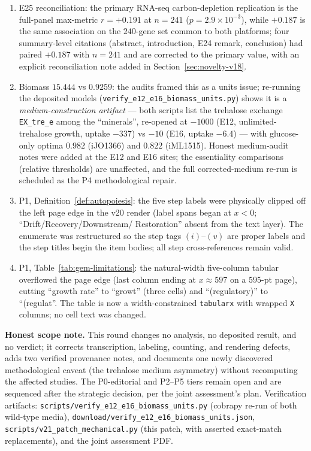 \documentclass[11pt,a4paper]{article}
\theoremstyle{plain}
\theoremstyle{definition}
\theoremstyle{remark}
\begin{document}
\begin{enumerate}
\texttt{autopoiesis\_ijO1366.csv} contains $11$ metabolites with
five or more producing reactions, of which $10$ are causally internal
(the single failure, ribose-D, has $n_{\mathrm{prod}} = 7$); the
totals $28/50$ and $18/39$ are unaffected.
\item E25 reconciliation: the primary RNA-seq carbon-depletion
replication is the full-panel max-metric $r = +0.191$ at $n = 241$
($p = 2.9 \times 10^{-3}$), while $+0.187$ is the same association
on the $240$-gene set common to both platforms; four summary-level
citations (abstract, introduction, E24 remark, conclusion) had paired
$+0.187$ with $n = 241$ and are corrected to the primary value, with
an explicit reconciliation note added in
Section~\ref{sec:novelty-v18}.
\item Biomass $15.444$ vs $0.9259$: the audits framed this as a
units issue; re-running the deposited models
(\texttt{verify\_e12\_e16\_biomass\_units.py}) shows it is a
\emph{medium-construction artifact} --- both scripts list the
trehalose exchange \texttt{EX\_tre\_e} among the ``minerals'',
re-opened at $-1000$ (E12, unlimited-trehalose growth, uptake
$-337$) vs $-10$ (E16, uptake $-6.4$) --- with glucose-only optima
$0.982$ (iJO1366) and $0.822$ (iML1515). Honest medium-audit notes
were added at the E12 and E16 sites; the essentiality comparisons
(relative thresholds) are unaffected, and the full corrected-medium
re-run is scheduled as the P4 methodological repair.
\item P1, Definition~\ref{def:autopoiesis}: the five step labels
were physically clipped off the left page edge in the v20 render
(label spans began at $x < 0$; ``Drift/Recovery/Downstream/
Restoration'' absent from the text layer). The enumerate was
restructured so the step tags $(i)$--$(v)$ are proper labels and the
step titles begin the item bodies; all step cross-references remain
valid.
\item P1, Table~\ref{tab:gem-limitations}: the natural-width
five-column tabular overflowed the page edge (last column ending at
$x \approx 597$ on a $595$-pt page), cutting ``growth rate'' to
``growt'' (three cells) and ``(regulatory)'' to ``(regulat''. The
table is now a width-constrained \texttt{tabularx} with wrapped
\texttt{X} columns; no cell text was changed.
\end{enumerate}

\textbf{Honest scope note.} This round changes no analysis, no
deposited result, and no verdict; it corrects transcription,
labeling, counting, and rendering defects, adds two verified
provenance notes, and documents one newly discovered methodological
caveat (the trehalose medium asymmetry) without recomputing the
affected studies. The P0-editorial and P2--P5 tiers remain open and
are sequenced after the strategic decision, per the joint
assessment's plan. Verification artifacts:
\texttt{scripts/verify\_e12\_e16\_biomass\_units.py} (cobrapy
re-run of both wild-type media),
\texttt{download/verify\_e12\_e16\_biomass\_units.json},
\texttt{scripts/v21\_patch\_mechanical.py} (this patch, with
asserted exact-match replacements), and the joint assessment PDF.
\end{document}
